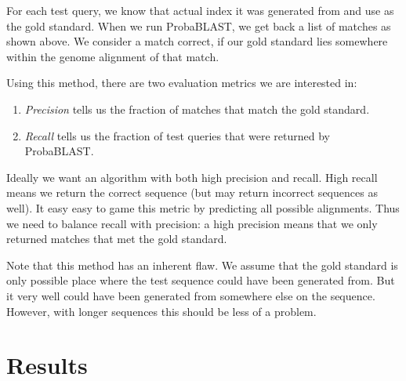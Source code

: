 \documentclass[12pt]{IEEEtran}
\begin{document}
For each test query, we know that actual index it was generated from and use as the gold standard. When we run ProbaBLAST, we get back a list of matches as shown above. We consider a match correct, if our gold standard lies somewhere within the genome alignment of that match.

Using this method, there are two evaluation metrics we are interested in:

\begin{enumerate}
\item \emph{Precision} tells us the fraction of matches that match the gold standard.
\item \emph{Recall} tells us the fraction of test queries that were returned by ProbaBLAST.
\end{enumerate}

Ideally we want an algorithm with both high precision and recall. High recall means we return the correct sequence (but may return incorrect sequences as well). It easy easy to game this metric by predicting all possible alignments. Thus we need to balance recall with precision: a high precision means that we only returned matches that met the gold standard.

Note that this method has an inherent flaw. We assume that the gold standard is only possible place where the test sequence could have been generated from. But it very well could have been generated from somewhere else on the sequence. However, with longer sequences this should be less of a problem.

\section{Results}
 
\end{document}
